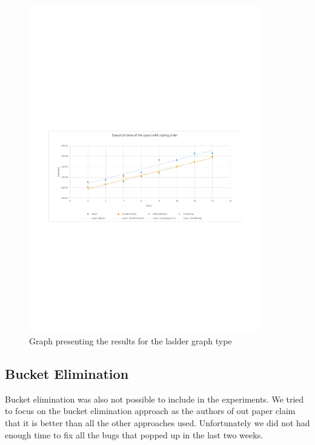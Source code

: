 \begin{figure}[h]
\center
	\includegraphics[width=0.9\textwidth]{figures/results_ladder}%
	\caption{Graph presenting the results for the ladder graph type}
	\label{fig:ResultsLadder}
\end{figure}

\subsection{Bucket Elimination} \label{subsec:ResultsBucket}
Bucket elimination was also not possible to include in the experiments. We tried to focus on the bucket elimination approach as the authors of out paper \cite{paper} claim that it is better than all the other approaches used. Unfortunately we did not had enough time to fix all the bugs that popped up in the last two weeks. 